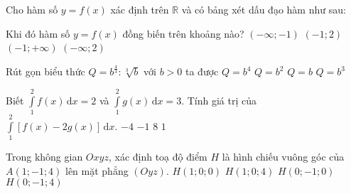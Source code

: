 \begin{ex}%
	Cho hàm số $y=f(x)$ xác định trên $\mathbb{R}$ và có bảng xét dấu đạo hàm như sau:
	\begin{center}
	\end{center}
	Khi đó hàm số $y=f(x)$ đồng biến trên khoảng nào?
	\choice
	{$(-\infty;-1)$}
	{\True $(-1;2)$}
	{$(-1;+\infty)$}
	{$(-\infty;2)$}
\end{ex}
\begin{ex}%
	Rút gọn biểu thức $Q=b^{\tfrac{4}{3}}:\sqrt[3]{b}$ với $b>0$ ta được
	\choice
	{$Q=b^4$}
	{$Q=b^2$}
	{\True $Q=b$}
	{$Q=b^3$}
\end{ex}
\begin{ex}%
	Biết $\displaystyle\int\limits_1^2 f(x) \mathrm{\,d}x=2$ và $\displaystyle\int\limits_1^2 g(x) \mathrm{\,d}x=3$. Tính giá trị của $\displaystyle\int\limits_1^2 \left[f(x)-2 g(x)\right] \mathrm{\,d}x$.
	\choice
	{\True $-4$}
	{$-1$}
	{$8$}
	{$1$}
\end{ex}
\begin{ex}%
	Trong không gian $Oxyz$, xác định toạ độ điểm $H$ là hình chiếu vuông góc của $A(1;-1;4)$ lên mặt phẳng $(Oyz)$.
	\choice
	{$H(1;0;0)$}
	{$H(1;0;4)$}
	{$H(0;-1;0)$}
	{\True $H(0;-1;4)$}
\end{ex}
